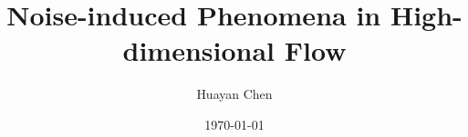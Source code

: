 \documentclass[notheorems, UTF8]{beamer}
\title[High-dim SDE]{Noise-induced Phenomena in High-dimensional Flow}
\author{Huayan Chen}
\institute[]
{
}
\date{\today}
\begin{document}
\begin{frame}
\titlepage
\end{frame}


\end{document}
